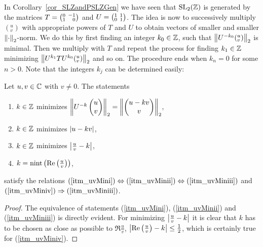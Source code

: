 In Corollary~\ref{cor_SLZandPSLZGen} we have seen that $\SL{\Z}$ is generated by the matrices $T = \smallmat{0}{-1}{1}{\phantom{-}0}$ and $U = \smallmat{1}{1}{0}{1}$. The idea is now to successively multiply $({}^u_v)$ with appropriate powers of $T$ and $U$ to obtain vectors of smaller and smaller $\eucnorm{\cdot}$-norm. We do this by first finding an integer $k_0 \in \Z$, such that $\eucnorm{U^{-k_0} ({}^u_v)}$ is minimal. Then we multiply with $T$ and repeat the process for finding $k_1 \in \Z$ minimizing $\eucnorm{U^{k_1} T U^{k_0} ({}^u_v)}$ and so on. The procedure ends when $k_n = 0$ for some $n>0$. Note that the integers $k_j$ can be determined easily:
\begin{lemma}
\label{lem_FunDomUVMin}
Let $u,v \in \C$ with $v \ne 0$. The statements
\begin{enumerate}[\qquad(i)]
\item \label{itm_uvMini}
$k \in \Z$ minimizes $\eucnorm{U^{-k}\cvec{u}{v}} = \eucnorm{\cvec{u - k v}{v}}$,
\item \label{itm_uvMinii} $k \in \Z$ minimizes $\abs{u - k v}$,
\item \label{itm_uvMiniii} $k \in \Z$ minimizes $\abs{\frac{u}{v} - k}$,
\item \label{itm_uvMiniv} $k = \nint{\Re{\frac{u}{v}}}$,
\end{enumerate}
satisfy the relations $(\ref{itm_uvMini}) \Leftrightarrow (\ref{itm_uvMinii}) \Leftrightarrow (\ref{itm_uvMiniii})$ and $(\ref{itm_uvMiniv}) \Rightarrow (\ref{itm_uvMiniii})$.
\end{lemma}
\begin{proof}
The equivalence of statements (\ref{itm_uvMini}), (\ref{itm_uvMinii}) and (\ref{itm_uvMiniii}) is directly evident. For minimizing $\abs{\frac{u}{v} - k}$ it is clear that $k$ has to be chosen as close as possible to $\Re{\frac{u}{v}}$, \ie $\abs{\Re{\frac{u}{v}} - k} \le \reci{2}$, which is certainly true for (\ref{itm_uvMiniv}).
\end{proof}

